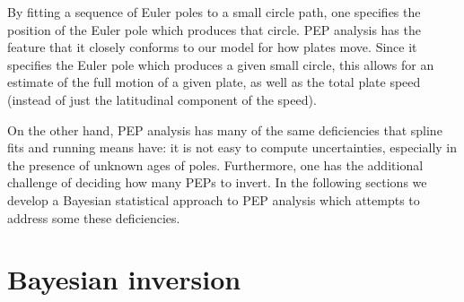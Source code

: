 \documentclass[preprint,12pt,authoryear]{elsarticle}
\begin{document}
By fitting a sequence of Euler poles to a small circle path, one specifies
the position of the Euler pole which produces that circle.
PEP analysis has the feature that it closely conforms to our model for how plates move.
Since it specifies the Euler pole which produces a given small circle,
this allows for an estimate of the full motion of a given plate, 
as well as the total plate speed (instead of just the latitudinal component of the speed).

On the other hand, PEP analysis has many of the same
deficiencies that spline fits and running means have: it is not easy to compute
uncertainties, especially in the presence of unknown ages of poles.
Furthermore, one has the additional challenge of deciding how many PEPs to invert.
In the following sections we develop a Bayesian statistical approach to
PEP analysis which attempts to address some these deficiencies.

\section{Bayesian inversion}
\label{sec:bayesian_inversion}
\end{document}
